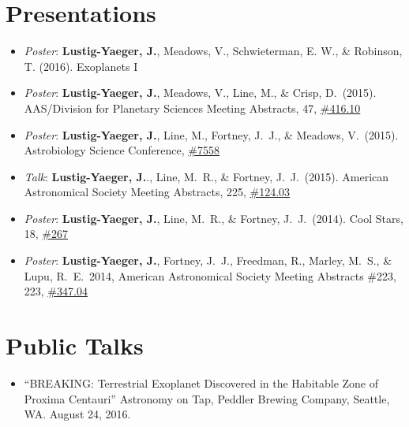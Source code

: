 \documentclass[margin,10pt]{res}
\begin{document}
\begin{resume}
\section{Presentations} 
                \begin{itemize}  
                    \item \textit{Poster}: \textbf{Lustig-Yaeger, J.}, Meadows, V., Schwieterman, E. W., \& Robinson, T. (2016). Exoplanets I
                    \item \textit{Poster}: \textbf{Lustig-Yaeger, J.}, Meadows, V., Line, M., \& Crisp, D.\ (2015). AAS/Division for Planetary Sciences Meeting Abstracts, 47, \href{http://adsabs.harvard.edu/abs/2015DPS....4741610L}{\#416.10}
                    \item \textit{Poster}: \textbf{Lustig-Yaeger, J.}, Line, M., Fortney, J.~J., \& Meadows, V.\ (2015). Astrobiology Science Conference, \href{http://www.hou.usra.edu/meetings/abscicon2015/pdf/7558.pdf}{\#7558}
                    \item \textit{Talk}: \textbf{Lustig-Yaeger, J.}., Line, M.~R., \& Fortney, J.~J.\ (2015). American Astronomical Society Meeting Abstracts, 225, \href{http://adsabs.harvard.edu/abs/2015AAS...22512403L}{\#124.03}
                    \item \textit{Poster}: \textbf{Lustig-Yaeger, J.},  Line, M.~R., \& Fortney, J.~J.\ (2014). Cool Stars, 18, \href{http://www2.lowell.edu/workshops/coolstars18/abstracts-posters/poster-abstract-267.html}{\#267}
                    \item \textit{Poster}: \textbf{Lustig-Yaeger, J.}, Fortney, J.~J., Freedman, R., Marley, M.~S., \& Lupu, R.~E.\ 2014, American Astronomical Society Meeting Abstracts \#223, 223, \href{http://adsabs.harvard.edu/abs/2014AAS...22334704L}{\#347.04}\\
                 \end{itemize}
                 
 \section{Public Talks}
                \begin{itemize}  
                    \item ``BREAKING: Terrestrial Exoplanet Discovered in the Habitable Zone of Proxima Centauri'' Astronomy on Tap, Peddler Brewing Company, Seattle, WA. August 24, 2016.
                 \end{itemize}

\end{resume}
\end{document}
